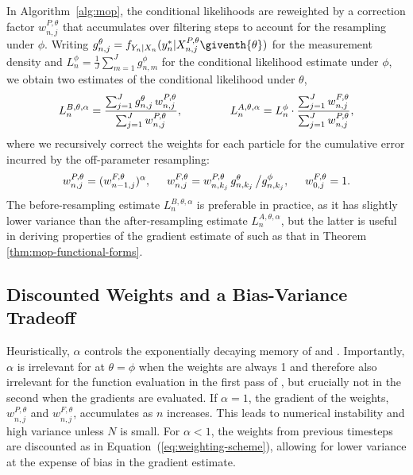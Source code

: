 In Algorithm~\ref{alg:mop}, the conditional likelihoods are reweighted by a correction factor $w^{P,\theta}_{n,j}$ that accumulates over filtering steps to account for the resampling under $\phi$. 
Writing $g^{\theta}_{n,j}={f}_{{Y}_{n}|{X}_{n}}(y_{n}^{*}|{X}_{n,j}^{P,\theta}\giventh{\theta})$ for the measurement density and $L_n^{\phi} = \frac{1}{J}\sum_{m=1}^{J}g^{\phi}_{n,m}$ for the conditional likelihood estimate under $\phi$, we obtain two estimates of the conditional likelihood under $\theta$,
\begin{equation}
     \label{eq:mop-conditional-likelihood}
     L_n^{B,\theta,\alpha} = \frac{\sum_{j=1}^Jg^\theta_{n,j}\, w^{P,\theta}_{n,j}}{\sum_{j=1}^J  w^{P,\theta}_{n,j}}, \arxiv{\hspace{15mm}}{\;\;}
     L_n^{A,\theta,\alpha} = L_n^\phi\cdot \frac{\sum_{j=1}^J w^{F,\theta}_{n,j}}{\sum_{j=1}^J  w^{P,\theta}_{n,j}},
\end{equation}
where we recursively correct the weights for each particle for the cumulative error incurred by the off-parameter resampling:
\begin{equation}
    \label{eq:weighting-scheme}
    w_{n,j}^{P,\theta} = (w_{n-1,j}^{F,\theta})^\alpha, 
    \hspace{5mm}
    w^{F,\theta}_{n,j} = w^{P,\theta}_{n,k_j} \, g^{\theta}_{n,k_j} \, \big/ g^{\phi}_{n,k_j}, 
    \hspace{5mm}
    w^{F,\theta}_{0,j}= 1.
\end{equation}
The before-resampling estimate $L_n^{B,\theta,\alpha}$ is preferable in practice, as it has slightly lower variance than the after-resampling estimate $L_n^{A,\theta,\alpha}$, but the latter is useful in deriving properties of the gradient estimate of  such as that in Theorem \ref{thm:mop-functional-forms}.


\subsection{Discounted Weights and a Bias-Variance Tradeoff}

Heuristically, $\alpha$ controls the exponentially decaying memory of  and .
Importantly, $\alpha$ is irrelevant for  at $\theta=\phi$ when the weights are always 1 and therefore also irrelevant for the function evaluation in the first pass of , but crucially not in the second when the gradients are evaluated.
If $\alpha=1$, the gradient of the weights, $w^{P,\theta}_{n,j}$ and $w^{F,\theta}_{n,j}$, accumulates as $n$ increases.
This leads to numerical instability and high variance unless $N$ is small.
For $\alpha<1$, the weights from previous timesteps are discounted as in Equation~(\ref{eq:weighting-scheme}), allowing for lower variance at the expense of bias in the gradient estimate.

